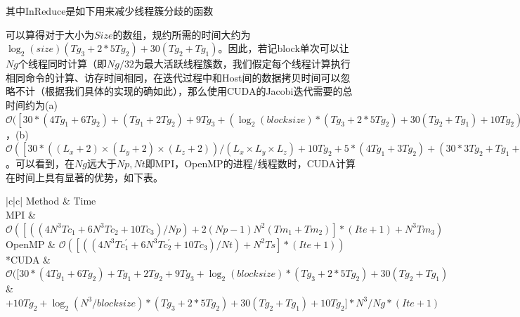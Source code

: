 \documentclass{article}
\newcommand{\mO}{\mathcal O}
\begin{document}
其中InReduce是如下用来减少线程簇分歧的函数
\begin{algorithm}[H]
	\caption{InReduce}
	\begin{algorithmic}[1]
\ENDFOR
	\end{algorithmic}
\end{algorithm}
可以算得对于大小为$Size$的数组，规约所需的时间大约为$\log_2(size)(Tg_3+2*5Tg_2)+30(Tg_2+Tg_1)$。因此，若记block单次可以让$Ng$个线程同时计算（即$Ng/32$为最大活跃线程簇数，我们假定每个线程计算执行相同命令的计算、访存时间相同，在迭代过程中和Host间的数据拷贝时间可以忽略不计（根据我们具体的实现的确如此），那么使用CUDA的Jacobi迭代需要的总时间约为(a)$\mO([30*(4Tg_1+6Tg_2) + (Tg_1+2Tg_2) + 9Tg_3 + (\log_2(blocksize)*(Tg_3+2*5Tg_2)+30(Tg_2+Tg_1)+10Tg_2)+(\log_2(N^3/blocksize)*(Tg_3+2*5Tg_2)+30(Tg_2+Tg_1) +10Tg_2)]*N^3/Ng * (Ite+1)$，(b)$\mO([30*((L_x+2)\times(L_y+2)\times(L_z+2))/(L_x\times L_y\times L_z)+10Tg_2+5*(4Tg_1+3Tg_2) + (30 * 3Tg_2+ Tg_1+2Tg_2)+ 9Tg_3 + (\log_2(blocksize)(Tg_3+2*5Tg_2)+30(Tg_2+Tg_1)+10Tg_2)+(\log_2(N^3/blocksize)*(Tg_3+2*5Tg_2)+30(Tg_2+Tg_1)+10Tg_2)]*N^3/Ng * (Ite+1))$。可以看到，在$Ng $远大于$Np,Nt$即MPI，OpenMP的进程/线程数时，CUDA计算在时间上具有显著的优势，如下表。
\begin{table}[H]
\begin{tabular}{|c|c|}
	\hline
    Method & Time \\\hline
    MPI &      $\mO([((4N^3Tc_1 + 6N^3Tc_2+10Tc_3)/Np)+2(Np-1)N^2(Tm_1+Tm_2) ]*(Ite+1) + N^3Tm_3)$         \\\hline
    OpenMP &    $\mO([((4N^3Tc_1^\prime + 6N^3Tc_2^\prime +10Tc_3)/Nt) + N^2 Ts ]*(Ite+1) )$         \\\hline
   *{CUDA} & $\mO([30*(4Tg_1+6Tg_2) + Tg_1+2Tg_2 + 9Tg_3 + \log_2(blocksize) *(Tg_3+2*5Tg_2)+30(Tg_2+Tg_1)$\\& $+10Tg_2+ \log_2(N^3/blocksize)*(Tg_3+2*5Tg_2)+30(Tg_2+Tg_1)+10Tg_2]*N^3/Ng * (Ite+1)$\\
   	\hline
\end{tabular}
	\caption{Jacobi迭代中不同并行方法所需理论时间\label{tb1}}
\end{table}
\end{document}

